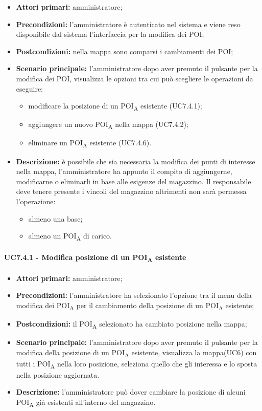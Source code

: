 \begin{itemize}
	\item 	\textbf{Attori primari:} amministratore;
	\item 	\textbf{Precondizioni:} l’amministratore è autenticato nel sistema e viene reso disponibile dal sistema l’interfaccia per la modifica dei POI;
	\item 	\textbf{Postcondizioni:} nella mappa sono comparsi i cambiamenti dei POI; 
	\item 	\textbf{Scenario principale:} l’amministratore dopo aver premuto il pulsante per la modifica dei POI, visualizza le opzioni tra cui può scegliere le operazioni da eseguire:
	\begin{itemize}
		\item modificare la posizione di un \acrshort{POI}\textsubscript{A} esistente (UC7.4.1);
		\item aggiungere un nuovo \acrshort{POI}\textsubscript{A} nella mappa (UC7.4.2);
		\item eliminare un \acrshort{POI}\textsubscript{A} esistente (UC7.4.6).
	\end{itemize}
	\item 	\textbf{Descrizione:} è possibile che sia necessaria la modifica dei punti di interesse nella mappa, l’amministratore ha appunto il compito di aggiungerne, modificarne o eliminarli in base alle esigenze del magazzino. Il responsabile deve tenere presente i vincoli del magazzino altrimenti non sarà permessa l’operazione:
	\begin{itemize}
		\item almeno una base;
		\item almeno un \acrshort{POI}\textsubscript{A} di carico.
	\end{itemize}
\end{itemize}

\paragraph{UC7.4.1 - Modifica posizione di un \acrshort{POI}\textsubscript{A} esistente}

\begin{itemize}
	\item 	\textbf{Attori primari:} amministratore;
	\item 	\textbf{Precondizioni:} l’amministratore ha selezionato l’opzione tra il menu della modifica dei \acrshort{POI}\textsubscript{A} per il cambiamento della posizione di un \acrshort{POI}\textsubscript{A} esistente;
	\item 	\textbf{Postcondizioni:} il \acrshort{POI}\textsubscript{A} selezionato ha cambiato posizione nella mappa; 
	\item 	\textbf{Scenario principale:} l’amministratore dopo aver premuto il pulsante per la modifica della posizione di un \acrshort{POI}\textsubscript{A} esistente, visualizza la mappa(UC6) con tutti i \acrshort{POI}\textsubscript{A} nella loro posizione, seleziona quello che gli interessa e lo sposta nella posizione aggiornata.
	\item 	\textbf{Descrizione:} l’amministratore può dover cambiare la posizione di alcuni \acrshort{POI}\textsubscript{A} già esistenti all’interno del magazzino.
\end{itemize}
